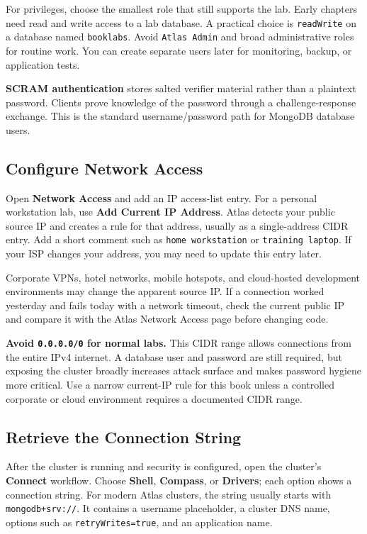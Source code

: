 For privileges, choose the smallest role that still supports the lab. Early chapters need read and write access to a lab database. A practical choice is \texttt{readWrite} on a database named \texttt{booklabs}. Avoid \texttt{Atlas Admin} and broad administrative roles for routine work. You can create separate users later for monitoring, backup, or application tests.

\begin{definitionbox}
\textbf{SCRAM authentication} stores salted verifier material rather than a plaintext password. Clients prove knowledge of the password through a challenge-response exchange. This is the standard username/password path for MongoDB database users.
\end{definitionbox}

\subsection{Configure Network Access}
Open \textbf{Network Access} and add an IP access-list entry. For a personal workstation lab, use \textbf{Add Current IP Address}. Atlas detects your public source IP and creates a rule for that address, usually as a single-address CIDR entry. Add a short comment such as \texttt{home workstation} or \texttt{training laptop}. If your ISP changes your address, you may need to update this entry later.

Corporate VPNs, hotel networks, mobile hotspots, and cloud-hosted development environments may change the apparent source IP. If a connection worked yesterday and fails today with a network timeout, check the current public IP and compare it with the Atlas Network Access page before changing code.

\begin{pitfall}
\textbf{Avoid \texttt{0.0.0.0/0} for normal labs.} This CIDR range allows connections from the entire IPv4 internet. A database user and password are still required, but exposing the cluster broadly increases attack surface and makes password hygiene more critical. Use a narrow current-IP rule for this book unless a controlled corporate or cloud environment requires a documented CIDR range.
\end{pitfall}

\subsection{Retrieve the Connection String}
After the cluster is running and security is configured, open the cluster's \textbf{Connect} workflow. Choose \textbf{Shell}, \textbf{Compass}, or \textbf{Drivers}; each option shows a connection string. For modern Atlas clusters, the string usually starts with \texttt{mongodb+srv://}. It contains a username placeholder, a cluster DNS name, options such as \texttt{retryWrites=true}, and an application name.

